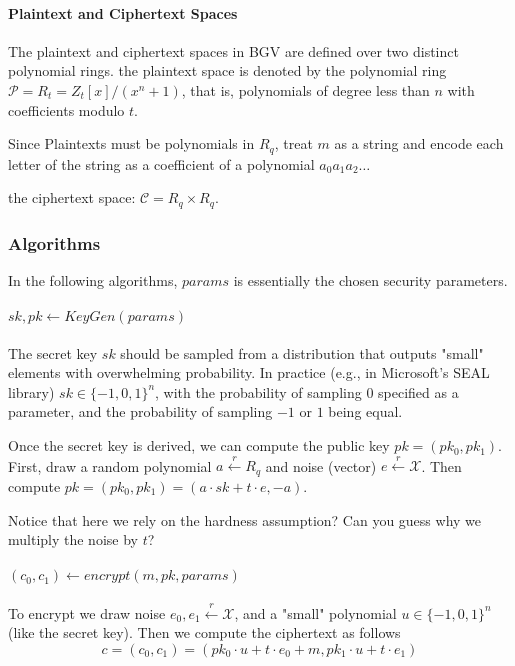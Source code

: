 \paragraph{Plaintext and Ciphertext Spaces}
The plaintext and ciphertext spaces in BGV are defined over two distinct
polynomial rings. the plaintext space is denoted by the polynomial
ring $\mathcal{P}=R_{t}= Z_{t}\left[x\right]/\left(x^{n}+1\right)$,
that is, polynomials of degree less than $n$ with coefficients modulo
$t$. 
\begin{remark}
    Since Plaintexts must be polynomials in $R_q$, treat 
    $m$ as a string and encode each letter of the string as a coefficient of a polynomial
    $a_{0}a_{1}a_{2}\dots$
\end{remark}


the ciphertext space: $\mathcal{C}=R_q \times R_q$. 

\subsubsection{Algorithms}
In the following algorithms, $params$ is essentially the chosen security parameters. 
\paragraph{$sk,pk \leftarrow KeyGen(params)$}
The secret key $sk$ should be sampled from a distribution that outputs "small" elements 
with overwhelming probability. In practice (e.g., in Microsoft's SEAL library) $sk\in\{-1,0,1\}^n$,
with the probability of sampling 0 specified as a parameter, and the probability of sampling $-1$ or $1$
being equal. 

Once the secret key is derived, we can compute the public key $pk=(pk_0,pk_1)$.
First, draw a random polynomial $a\overset{r}{\leftarrow} R_q$ and 
noise (vector) $e\overset{r}{\leftarrow} \mathcal{X}$. Then compute 
$pk=(pk_0,pk_1)=(a\cdot sk+t\cdot e, -a)$.

Notice that here we rely on the hardness assumption? 
Can you guess why we multiply the noise by $t$?

\paragraph{$(c_0,c_1) \leftarrow encrypt(m,pk, params)$}
To encrypt we draw noise $e_0,e_1 \overset{r}{\leftarrow} \mathcal{X}$, and a "small" polynomial 
$u\in \{-1,0,1\}^n$ (like the secret key).
Then we compute the ciphertext as follows $$c=(c_0,c_1)= (pk_0\cdot u +t\cdot e_0+m, pk_1\cdot u +t\cdot e_1)$$

